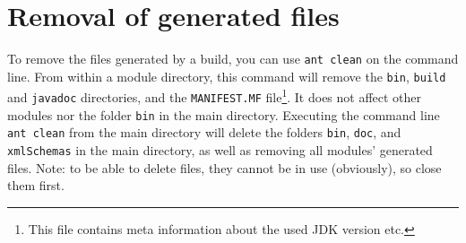 \section{Removal of generated files}
To remove the files generated by a build, you can use \verb|ant clean| on the command line. From within a module directory, this command will remove the \verb|bin|, \verb|build| and \verb|javadoc| directories, and the \verb|MANIFEST.MF| file\footnote{This file contains meta information about the used JDK version etc.}. It does not affect other modules nor the folder \verb|bin| in the \oda main directory. Executing the command line \verb|ant clean| from the \oda main directory will delete the folders \verb|bin|, \verb|doc|, and \verb|xmlSchemas| in the main directory, as well as removing all modules' generated files. Note: to be able to delete files, they cannot be in use (obviously), so close them first.

